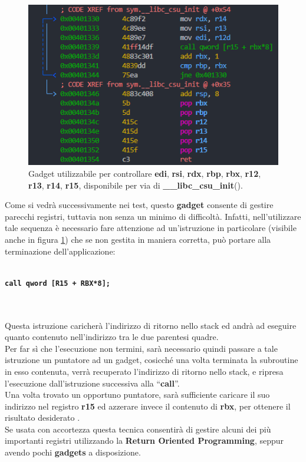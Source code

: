 \begin{figure}[htbp]
    \centerline{\includegraphics[scale=.65]{images/__libc_csu_init.png}}
    \caption{Gadget utilizzabile per controllare \textbf{edi}, \textbf{rsi}, \textbf{rdx}, \textbf{rbp}, \textbf{rbx}, \textbf{r12}, \textbf{r13}, \textbf{r14}, \textbf{r15}, disponibile per via di \textbf{\_\_libc\_csu\_init}().}
    \label{fig:csu-gadget}
\end{figure}

Come si vedrà successivamente nei test, questo \textbf{gadget} consente di gestire parecchi registri, tuttavia non senza un minimo di difficoltà. Infatti, nell'utilizzare tale sequenza è necessario fare attenzione ad un'istruzione in particolare (visibile anche in figura \ref{fig:csu-gadget}) che se non gestita in maniera corretta, può portare alla terminazione dell'applicazione:
\\\\\centerline{\texttt{\large{\textbf{\textcolor{Bittersweet}{call}  \space  qword [R15 + RBX*8];}}}}\\\\
Questa istruzione caricherà l'indirizzo di ritorno nello stack ed andrà ad eseguire quanto contenuto nell'indirizzo tra le due parentesi quadre.\\
Per far sì che l'esecuzione non termini, sarà necessario quindi passare a tale istruzione un puntatore ad un gadget, cosicché una volta terminata la subroutine in esso contenuta, verrà recuperato l'indirizzo di ritorno nello stack, e ripresa l'esecuzione dall'istruzione successiva alla ``\textbf{call}''.\\
Una volta trovato un opportuno puntatore, sarà sufficiente caricare il suo indirizzo nel registro \textbf{r15} ed azzerare invece il contenuto di \textbf{rbx}, per ottenere il risultato desiderato \cite*{return-to-csu2}.\\
Se usata con accortezza questa tecnica consentirà di gestire alcuni dei più importanti registri utilizzando la \textbf{Return Oriented Programming}, seppur avendo pochi \textbf{gadgets} a disposizione.

